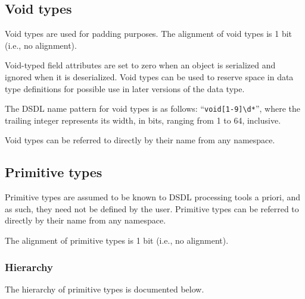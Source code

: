 \subsection{Void types}

Void types are used for padding purposes.
The alignment of void types is 1 bit (i.e., no alignment).

Void-typed field attributes are set to zero when an object is serialized and ignored when it is deserialized.
Void types can be used to reserve space in data type definitions for possible use in later versions of the data type.

The DSDL name pattern for void types is as follows: ``\verb|void[1-9]\d*|'',
where the trailing integer represents its width, in bits,
ranging from 1 to 64, inclusive.

Void types can be referred to directly by their name from any namespace.

\subsection{Primitive types}\label{sec:dsdl_primitive_types}

Primitive types are assumed to be known to DSDL processing tools a priori,
and as such, they need not be defined by the user.
Primitive types can be referred to directly by their name from any namespace.

The alignment of primitive types is 1 bit (i.e., no alignment).

\subsubsection{Hierarchy}

The hierarchy of primitive types is documented below.

